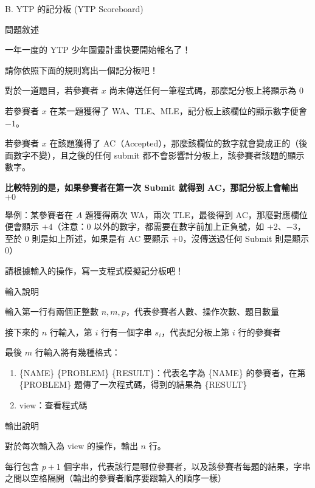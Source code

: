 \documentclass[12pt]{article}
\newcommand{\ProblemTitleFont}{\ProblemTitleMainFont\ProblemTitleCJKFont}
\newcommand{\ProblemTitle}[2]{\noindent\Large{\ProblemTitleFont #1 (#2)}\normalsize\par}
\newcommand{\ProblemSection}[1]{\vspace{0.6cm}\par\noindent\large{\ProblemTitleFont #1}\normalsize\par}
\newcommand{\ProblemStatement}{\ProblemSection{問題敘述}}
\newcommand{\ProblemInput}{\ProblemSection{輸入說明}}
\newcommand{\ProblemOutput}{\ProblemSection{輸出說明}}
\begin{document}
\renewcommand{\headrulewidth}{0pt}
\renewcommand{\baselinestretch}{1.3}
\setlength\parindent{24pt}
\setlength\parskip{12pt}
\cfoot{\thepage}

\ProblemTitle{B. YTP 的記分板}{YTP Scoreboard}

\ProblemStatement

一年一度的 YTP 少年圖靈計畫快要開始報名了！

請你依照下面的規則寫出一個記分板吧！

對於一道題目，若參賽者 $x$ 尚未傳送任何一筆程式碼，那麼記分板上將顯示為 $0$

若參賽者 $x$ 在某一題獲得了 WA、TLE、MLE，記分板上該欄位的顯示數字便會 $-1$。

若參賽者 $x$ 在該題獲得了 AC（Accepted），那麼該欄位的數字就會變成正的（後面數字不變），且之後的任何 submit 都不會影響計分板上，該參賽者該題的顯示數字。

\textbf{比較特別的是，如果參賽者在第一次 Submit 就得到 AC，那記分板上會輸出} $+0$

舉例：某參賽者在 $A$ 題獲得兩次 WA，兩次 TLE，最後得到 AC，那麼對應欄位便會顯示 $+4$（注意：$0$ 以外的數字，都需要在數字前加上正負號，如 $+2$、$-3$，至於 $0$ 則是如上所述，如果是有 AC 要顯示 $+0$，沒傳送過任何 Submit 則是顯示 $0$）

請根據輸入的操作，寫一支程式模擬記分板吧！

\ProblemInput

輸入第一行有兩個正整數 $n, m, p$，代表參賽者人數、操作次數、題目數量

接下來的 $n$ 行輸入，第 $i$ 行有一個字串 $s_i$，代表記分板上第 $i$ 行的參賽者

最後 $m$ 行輸入將有幾種格式：

\begin{enumerate}
\item \{NAME\} \{PROBLEM\} \{RESULT\}：代表名字為 \{NAME\} 的參賽者，在第 \{PROBLEM\} 題傳了一次程式碼，得到的結果為 \{RESULT\}
\item view：查看程式碼
\end{enumerate}

\clearpage

\ProblemOutput

對於每次輸入為 view 的操作，輸出 $n$ 行。

每行包含 $p + 1$ 個字串，代表該行是哪位參賽者，以及該參賽者每題的結果，字串之間以空格隔開（輸出的參賽者順序要跟輸入的順序一樣）
\end{document}
